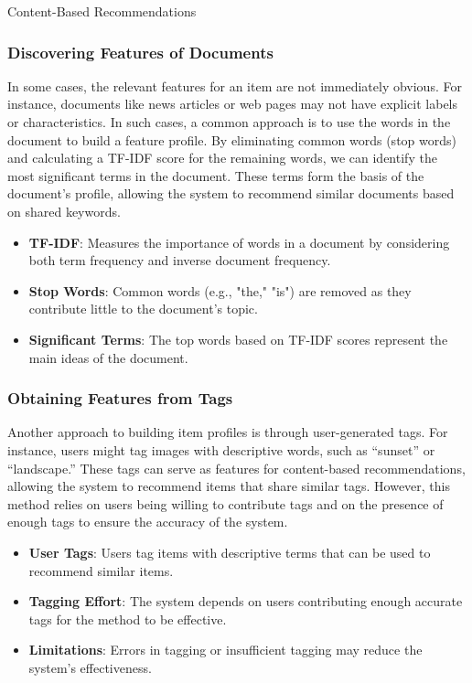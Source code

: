 \begin{notes}{Content-Based Recommendations}
    \subsubsection*{Discovering Features of Documents}
    
    In some cases, the relevant features for an item are not immediately obvious. For instance, documents like news articles or web pages may not have explicit labels or characteristics. In such cases, a common 
    approach is to use the words in the document to build a feature profile. By eliminating common words (stop words) and calculating a TF-IDF score for the remaining words, we can identify the most significant 
    terms in the document. These terms form the basis of the document's profile, allowing the system to recommend similar documents based on shared keywords.
    
    \begin{highlight}
        \begin{itemize}
            \item \textbf{TF-IDF}: Measures the importance of words in a document by considering both term frequency and inverse document frequency.
            \item \textbf{Stop Words}: Common words (e.g., "the," "is") are removed as they contribute little to the document's topic.
            \item \textbf{Significant Terms}: The top words based on TF-IDF scores represent the main ideas of the document.
        \end{itemize}
    \end{highlight}
    
    \subsubsection*{Obtaining Features from Tags}
    
    Another approach to building item profiles is through user-generated tags. For instance, users might tag images with descriptive words, such as “sunset” or “landscape.” These tags can serve as features 
    for content-based recommendations, allowing the system to recommend items that share similar tags. However, this method relies on users being willing to contribute tags and on the presence of enough tags 
    to ensure the accuracy of the system.
    
    \begin{highlight}
        \begin{itemize}
            \item \textbf{User Tags}: Users tag items with descriptive terms that can be used to recommend similar items.
            \item \textbf{Tagging Effort}: The system depends on users contributing enough accurate tags for the method to be effective.
            \item \textbf{Limitations}: Errors in tagging or insufficient tagging may reduce the system's effectiveness.
        \end{itemize}
    \end{highlight}
    

\end{notes}
